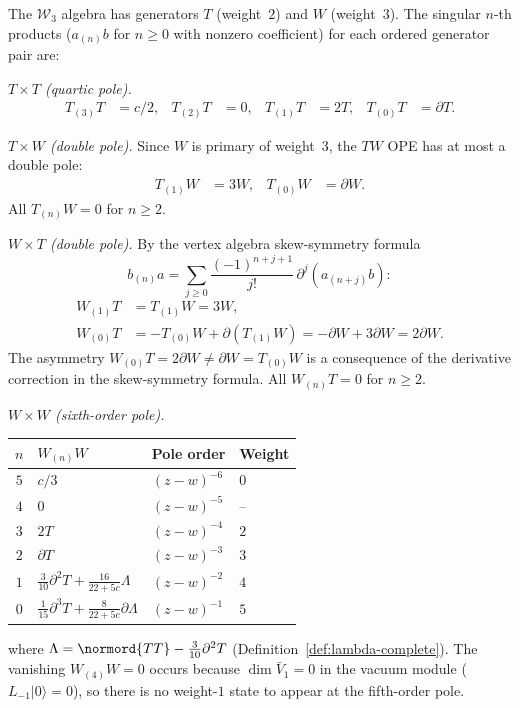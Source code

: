 \begin{computation}\label{comp:w3-nthproducts}
The $\mathcal{W}_3$ algebra has generators $T$ (weight~$2$) and $W$ (weight~$3$).
The singular $n$-th products ($a_{(n)}b$ for $n \geq 0$ with nonzero coefficient)
for each ordered generator pair are:

\emph{$T \times T$ (quartic pole).}
\begin{align*}
T_{(3)}T &= c/2, & T_{(2)}T &= 0, &
T_{(1)}T &= 2T, & T_{(0)}T &= \partial T.
\end{align*}

\emph{$T \times W$ (double pole).}
Since $W$ is primary of weight~$3$, the $TW$ OPE has at most a double pole:
\begin{align*}
T_{(1)}W &= 3W, & T_{(0)}W &= \partial W.
\end{align*}
All $T_{(n)}W = 0$ for $n \geq 2$.

\emph{$W \times T$ (double pole).}
By the vertex algebra skew-symmetry formula
\[
b_{(n)}a = \sum_{j \geq 0}
\frac{(-1)^{n+j+1}}{j!}\,\partial^j(a_{(n+j)}b)\colon
\]
\begin{align*}
W_{(1)}T &= T_{(1)}W = 3W, \\
W_{(0)}T &= -T_{(0)}W + \partial(T_{(1)}W) = -\partial W + 3\partial W = 2\partial W.
\end{align*}
The asymmetry $W_{(0)}T = 2\partial W \neq \partial W = T_{(0)}W$ is a consequence
of the derivative correction in the skew-symmetry formula. All $W_{(n)}T = 0$ for $n \geq 2$.

\emph{$W \times W$ (sixth-order pole).}
\begin{center}
\begin{tabular}{clll}
$n$ & $W_{(n)}W$ & Pole order & Weight \\
\hline
$5$ & $c/3$ & $(z\!-\!w)^{-6}$ & $0$ \\
$4$ & $0$ & $(z\!-\!w)^{-5}$ & -- \\
$3$ & $2T$ & $(z\!-\!w)^{-4}$ & $2$ \\
$2$ & $\partial T$ & $(z\!-\!w)^{-3}$ & $3$ \\
$1$ & $\tfrac{3}{10}\partial^2 T + \tfrac{16}{22+5c}\Lambda$ & $(z\!-\!w)^{-2}$ & $4$ \\
$0$ & $\tfrac{1}{15}\partial^3 T + \tfrac{8}{22+5c}\partial\Lambda$ & $(z\!-\!w)^{-1}$ & $5$
\end{tabular}
\end{center}
where $\Lambda = \normord{TT} - \frac{3}{10}\partial^2 T$ (Definition~\ref{def:lambda-complete}).
The vanishing $W_{(4)}W = 0$ occurs because $\dim \bar{V}_1 = 0$ in the vacuum module
($L_{-1}|0\rangle = 0$), so there is no weight-$1$ state to appear at the fifth-order pole.
\end{computation}


